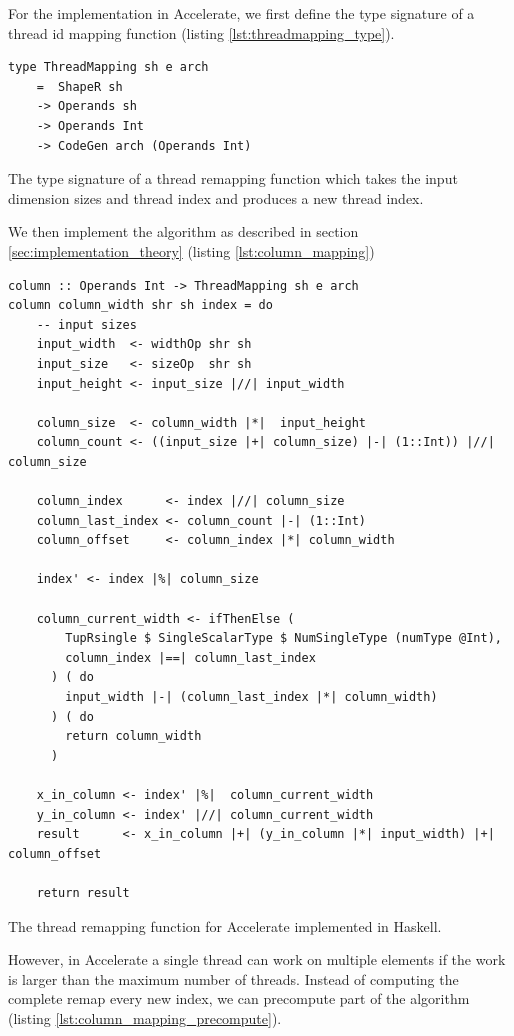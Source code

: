 For the implementation in Accelerate, we first define the type signature of a thread id mapping function (listing {\ref{lst:threadmapping_type}}).
\begin{listing}[!ht]
    \begin{verbatim}    
type ThreadMapping sh e arch 
    =  ShapeR sh 
    -> Operands sh 
    -> Operands Int 
    -> CodeGen arch (Operands Int)
    \end{verbatim}
    \caption{
        The type signature of a thread remapping function which takes the input dimension sizes and thread index and produces a new thread index.
    }
    \label{lst:threadmapping_type}
\end{listing}
We then implement the algorithm as described in section \ref{sec:implementation_theory} (listing \ref{lst:column_mapping})
\begin{listing}
    \begin{verbatim}
column :: Operands Int -> ThreadMapping sh e arch
column column_width shr sh index = do
    -- input sizes
    input_width  <- widthOp shr sh
    input_size   <- sizeOp  shr sh
    input_height <- input_size |//| input_width
    
    column_size  <- column_width |*|  input_height
    column_count <- ((input_size |+| column_size) |-| (1::Int)) |//| column_size

    column_index      <- index |//| column_size
    column_last_index <- column_count |-| (1::Int)
    column_offset     <- column_index |*| column_width

    index' <- index |%| column_size

    column_current_width <- ifThenElse (
        TupRsingle $ SingleScalarType $ NumSingleType (numType @Int), 
        column_index |==| column_last_index
      ) ( do
        input_width |-| (column_last_index |*| column_width)
      ) ( do
        return column_width
      )
    
    x_in_column <- index' |%|  column_current_width
    y_in_column <- index' |//| column_current_width
    result      <- x_in_column |+| (y_in_column |*| input_width) |+| column_offset

    return result
    \end{verbatim}
    \caption{
        The thread remapping function for Accelerate implemented in Haskell.
    }
    \label{lst:column_mapping}
\end{listing}
However, in Accelerate a single thread can work on multiple elements if the work is larger than the maximum number of threads.
Instead of computing the complete remap every new index, we can precompute part of the algorithm (listing \ref{lst:column_mapping_precompute}).


